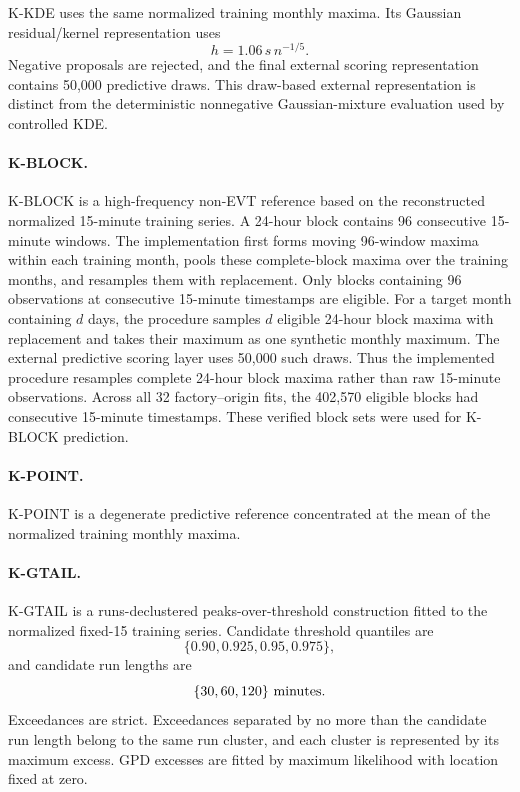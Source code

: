 \documentclass[AMA,Times1COL]{WileyNJDv5}
\begin{document}
K-KDE uses the same normalized training monthly maxima. Its Gaussian
residual/kernel representation uses
\[
h=1.06\,s\,n^{-1/5}.
\]
Negative proposals are rejected, and the final external scoring
representation contains 50,000 predictive draws. This draw-based
external representation is distinct from the deterministic
nonnegative Gaussian-mixture evaluation used by controlled KDE.

\paragraph*{K-BLOCK.}

K-BLOCK is a high-frequency non-EVT reference based on the
reconstructed normalized 15-minute training series. A 24-hour block
contains 96 consecutive 15-minute windows. The implementation first
forms moving 96-window maxima within each training month, pools these
complete-block maxima over the training months, and resamples them with
replacement. Only blocks containing 96 observations at consecutive
15-minute timestamps are eligible. For a target month containing $d$
days, the procedure samples $d$ eligible 24-hour block maxima with
replacement and takes their maximum as one synthetic monthly maximum.
The external predictive scoring layer uses 50,000 such draws. Thus the
implemented procedure resamples complete 24-hour block maxima rather
than raw 15-minute observations.
Across all 32 factory--origin fits, the 402,570 eligible blocks had
consecutive 15-minute timestamps. These verified block sets were used
for K-BLOCK prediction.

\paragraph*{K-POINT.}

K-POINT is a degenerate predictive reference concentrated at the mean
of the normalized training monthly maxima.

\paragraph*{K-GTAIL.}

K-GTAIL is a runs-declustered peaks-over-threshold construction fitted
to the normalized fixed-15 training series. Candidate threshold
quantiles are
\[
\{0.90,0.925,0.95,0.975\},
\]
and candidate run lengths are
\[
\{30,60,120\}\ {\rm minutes}.
\]
Exceedances are strict. Exceedances separated by no more than the
candidate run length belong to the same run cluster, and each cluster
is represented by its maximum excess. GPD excesses are fitted by
maximum likelihood with location fixed at zero.
\end{document}
